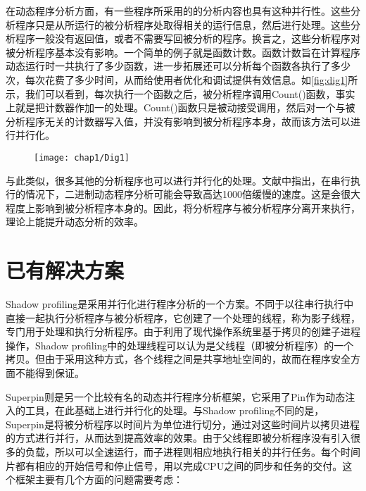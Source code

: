 在动态程序分析方面，有一些程序所采用的的分析内容也具有这种并行性。这些分析程序只是从所运行的被分析程序处取得相关的运行信息，然后进行处理。这些分析程序一般没有返回值，或者不需要写回被分析的程序。换言之，这些分析程序对被分析程序基本没有影响。一个简单的例子就是函数计数。函数计数旨在计算程序动态运行时一共执行了多少函数，进一步拓展还可以分析每个函数各执行了多少次，每次花费了多少时间，从而给使用者优化和调试提供有效信息。如\ref{fig:dig1}所示，我们可以看到，每次执行一个函数之后，被分析程序调用Count()函数，事实上就是把计数器作加一的处理。Count()函数只是被动接受调用，然后对一个与被分析程序无关的计数器写入值，并没有影响到被分析程序本身，故而该方法可以进行并行化。

\begin{figure}[!htp]
  \centering
  \texttt{[image: chap1/Dig1]}
\end{figure}

与此类似，很多其他的分析程序也可以进行并行化的处理。文献\cite{paSpeed}中指出，在串行执行的情况下，二进制动态程序分析可能会导致高达1000倍缓慢的速度。这是会很大程度上影响到被分析程序本身的。因此，将分析程序与被分析程序分离开来执行，理论上能提升动态分析的效率。

\section{已有解决方案}

Shadow profiling\cite{shaPro}是采用并行化进行程序分析的一个方案。不同于以往串行执行中直接一起执行分析程序与被分析程序，它创建了一个处理的线程，称为影子线程，专门用于处理和执行分析程序。由于利用了现代操作系统里基于拷贝的创建子进程操作，Shadow profiling中的处理线程可以认为是父线程（即被分析程序）的一个拷贝。但由于采用这种方式，各个线程之间是共享地址空间的，故而在程序安全方面不能得到保证。

Superpin\cite{superPin}则是另一个比较有名的动态并行程序分析框架，它采用了Pin作为动态注入的工具，在此基础上进行并行化的处理。与Shadow profiling不同的是，Superpin是将被分析程序以时间片为单位进行切分，通过对这些时间片以拷贝进程的方式进行并行，从而达到提高效率的效果。由于父线程即被分析程序没有引入很多的负载，所以可以全速运行，而子进程则相应地执行相关的并行任务。每个时间片都有相应的开始信号和停止信号，用以完成CPU之间的同步和任务的交付。这个框架主要有几个方面的问题需要考虑：

